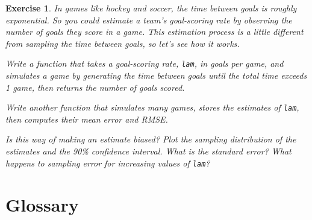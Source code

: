 \documentclass[12pt]{book}
\theoremstyle{exercise}
\newtheorem{exercise}{Exercise}[chapter]
\begin{document}
\begin{exercise}

In games like hockey and soccer, the time between goals is
roughly exponential.  So you could estimate a team's goal-scoring rate
by observing the number of goals they score in a game.  This
estimation process is a little different from sampling the time
between goals, so let's see how it works.%
%

Write a function that takes a goal-scoring rate, {\tt lam}, in goals
per game, and simulates a game by generating the time between goals
until the total time exceeds 1 game, then returns the number of goals
scored.

Write another function that simulates many games, stores the
estimates of {\tt lam}, then computes their mean error and RMSE.

Is this way of making an estimate biased?  Plot the sampling
distribution of the estimates and the 90\% confidence interval.  What
is the standard error?  What happens to sampling error for increasing
values of {\tt lam}?%
%
%
%

\end{exercise}


\section{Glossary}
\end{document}
